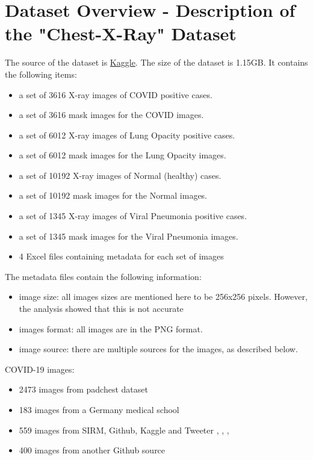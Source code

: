 \documentclass{article}
\begin{document}
\section{Dataset Overview - Description of the "Chest-X-Ray" Dataset}
The source of the dataset is \href{https://www.kaggle.com/tawsifurrahman/covid19-radiography-database} {Kaggle}. The size of the dataset is 1.15GB. It contains the following items:
\begin{itemize}
    \item a set of 3616  X-ray images of COVID positive cases.
    \item a set of 3616 mask images for the COVID images.
    \item a set of 6012  X-ray images of Lung Opacity positive cases.
    \item a set of 6012 mask images for the Lung Opacity images.
    \item a set of 10192  X-ray images of Normal (healthy) cases.
    \item a set of 10192 mask images for the Normal images.
    \item a set of 1345  X-ray images of Viral Pneumonia positive cases.
    \item a set of 1345 mask images for the Viral Pneumonia images.
    \item  4 Excel files containing metadata for each set of images
\end{itemize}

The metadata files contain the following information:
\begin{itemize}
    \item image size: all images sizes are mentioned here to be 256x256 pixels. However, the analysis showed that this is not accurate
    \item images format: all images are in the PNG format.
    \item image source: there are multiple sources for the images, as described below.
\end{itemize}

COVID-19 images:
\begin{itemize}
    \item 2473 images from padchest dataset \cite{url_1}
    \item 183 images from a Germany medical school \cite{url_2}
    \item 559 images from SIRM, Github, Kaggle and Tweeter \cite{url_3}, \cite{url_4}, \cite{url_5}, \cite{url_6}
    \item 400 images from another Github source \cite{url_7}
\end{itemize}
\end{document}
